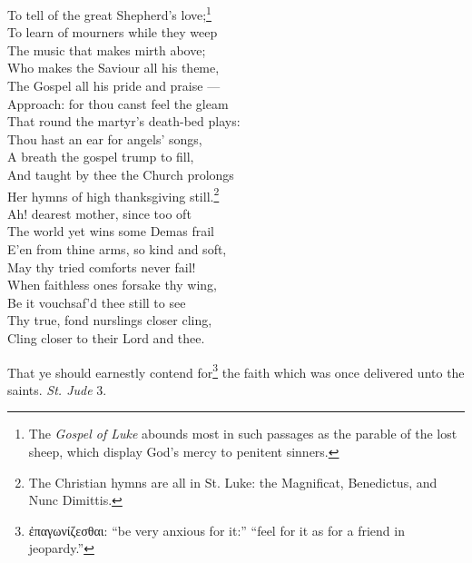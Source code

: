  To tell of the great Shepherd’s love;\footnote{The \emph{Gospel of Luke} abounds most in such passages as the parable of the lost sheep, which display God’s mercy to penitent sinners.} \\
 To learn of mourners while they weep \\
 The music that makes mirth above; \\
  Who makes the Saviour all his theme, \\
 The Gospel all his pride and praise — \\
 Approach: for thou canst feel the gleam \\
 That round the martyr’s death-bed plays: \\
  Thou hast an ear for angels’ songs, \\
 A breath the gospel trump to fill, \\
 And taught by thee the Church prolongs \\
 Her hymns of high thanksgiving still.\footnote{The Christian hymns are all in St. Luke: the Magnificat, Benedictus, and Nunc Dimittis.} \\
  Ah! dearest mother, since too oft \\
 The world yet wins some Demas frail \\
 E’en from thine arms, so kind and soft, \\
 May thy tried comforts never fail! \\
  When faithless ones forsake thy wing, \\
 Be it vouchsaf’d thee still to see \\
 Thy true, fond nurslings closer cling, \\
 Cling closer to their Lord and thee.\\


That ye should earnestly contend for\footnote{\textgreek{ἐπαγωνίζεσθαι}: “be very anxious for it:” “feel for it as for a friend in jeopardy.”} the faith which was once delivered unto the saints. \emph{St. Jude} 3.

